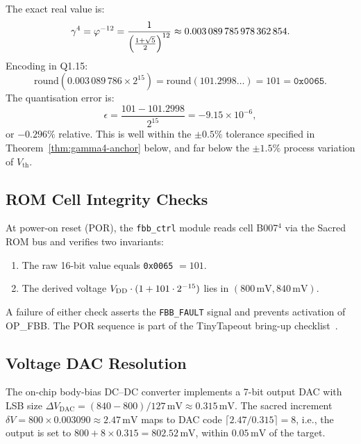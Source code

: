 The exact real value is:
\begin{equation}
  \gamma^{4}{} = \varphi^{-12}{}
    = \frac{1}{\left(\frac{1+\sqrt{5}}{2}\right)^{12}}
    \approx 0.003\,089\,785\,978\,362\,854.
  \label{eq:gamma4-exact}
\end{equation}
Encoding in Q1.15:
\begin{equation}
  \mathrm{round}(0.003\,089\,786 \times 2^{15})
    = \mathrm{round}(101.2998\ldots)
    = 101
    = \texttt{0x0065}.
  \label{eq:gamma4-q115}
\end{equation}
The quantisation error is:
\begin{equation}
  \epsilon = \frac{101 - 101.2998}{2^{15}} = -9.15 \times 10^{-6},
  \label{eq:gamma4-quant-error}
\end{equation}
or $-0.296\%$ relative.  This is well within the $\pm 0.5\%$ tolerance
specified in Theorem~\ref{thm:gamma4-anchor} below, and far below the
$\pm 1.5\%$ process variation of $V_{\mathrm{th}}$.

\subsection{ROM Cell Integrity Checks}
\label{subsec:rom-integrity}

At power-on reset (POR), the \texttt{fbb\_ctrl} module reads cell B007$^{4}$
via the Sacred ROM bus and verifies two invariants:
\begin{enumerate}
  \item The raw 16-bit value equals \texttt{0x0065} $= 101$.
  \item The derived voltage $V_{\mathrm{DD}} \cdot (1 + 101 \cdot 2^{-15})$
        lies in $(800\,\mathrm{mV}, 840\,\mathrm{mV})$.
\end{enumerate}
A failure of either check asserts the \texttt{FBB\_FAULT} signal and
prevents activation of OP\_FBB.  The POR sequence is part of the
TinyTapeout bring-up checklist~\cite{TINYTAPEOUT}.

\subsection{Voltage DAC Resolution}
\label{subsec:dac}

The on-chip body-bias DC--DC converter implements a 7-bit output DAC
with LSB size $\Delta V_{\mathrm{DAC}} = (840 - 800)/127\,\mathrm{mV}
\approx 0.315\,\mathrm{mV}$.  The sacred increment
$\delta V = 800 \times 0.003090 \approx 2.47\,\mathrm{mV}$
maps to DAC code $\lceil 2.47/0.315 \rceil = 8$, i.e., the output is
set to $800 + 8 \times 0.315 = 802.52\,\mathrm{mV}$, within
$0.05\,\mathrm{mV}$ of the target.


